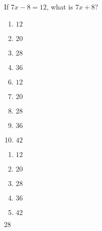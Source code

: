 

 If $7x-8=12$, what is $7x+8?$ 


\ifsat
	\begin{enumerate}[label=\Alph*)]
		\item   $12$
		\item  $20$
		\item  $28$%
		\item  $36$
	\end{enumerate}
\else
\fi

\ifacteven
	\begin{enumerate}[label=\textbf{\Alph*.},itemsep=\fill,align=left]
		\setcounter{enumii}{5}
		\item   $12$
		\item  $20$
		\item  $28$%
		\addtocounter{enumii}{1}
		\item  $36$
		\item   $42$
	\end{enumerate}
\else
\fi

\ifactodd
	\begin{enumerate}[label=\textbf{\Alph*.},itemsep=\fill,align=left]
		\item   $12$
		\item  $20$
		\item  $28$%
		\item  $36$
		\item   $42$
	\end{enumerate}
\else
\fi

\ifgridin
  $28$%
		
\else
\fi


